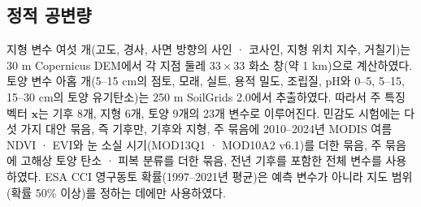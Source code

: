 \subsection{정적 공변량}
지형 변수 여섯 개(고도, 경사, 사면 방향의 사인 · 코사인, 지형 위치 지수, 거칠기)는 30 m Copernicus DEM\cite{CopDEM2021}에서 각 지점 둘레 $33\times33$ 화소 창(약 1 km)으로 계산하였다. 토양 변수 아홉 개(5--15 cm의 점토, 모래, 실트, 용적 밀도, 조립질, pH와 0--5, 5--15, 15--30 cm의 토양 유기탄소)는 250 m SoilGrids 2.0\cite{Poggio2021}에서 추출하였다. 따라서 주 특징 벡터 $\mathbf{x}$는 기후 8개, 지형 6개, 토양 9개의 23개 변수로 이루어진다. 민감도 시험에는 다섯 가지 대안 묶음, 즉 기후만, 기후와 지형, 주 묶음에 2010--2024년 MODIS 여름 NDVI · EVI와 눈 소실 시기(MOD13Q1 · MOD10A2 v6.1)\cite{Didan2021,HallRiggs2021}를 더한 묶음, 주 묶음에 고해상 토양 탄소 · 피복 분류\cite{Palmtag2022}를 더한 묶음, 전년 기후를 포함한 전체 변수를 사용하였다. ESA CCI 영구동토 확률(1997--2021년 평균)\cite{Westermann2024}은 예측 변수가 아니라 지도 범위(확률 50\% 이상)를 정하는 데에만 사용하였다.

